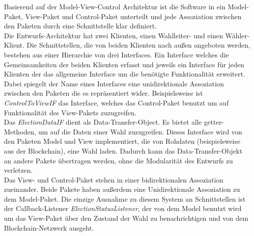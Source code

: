 \documentclass[parskip=full]{scrartcl}
\newcommand{\textitx}[1]{\mbox{\textit{#1}}}
\begin{document}
	Basierend auf der Model-View-Control Architektur ist die Software in ein Model-Paket, View-Paket und Control-Paket unterteilt und jede Assoziation zwischen den Paketen durch eine Schnittstelle klar definiert. 
	\\
	Die Entwurfs-Architektur hat zwei Klienten, einen Wahlleiter- und einen Wähler-Klient. Die Schnittstellen, die von beiden Klienten nach außen angeboten werden, bestehen aus einer Hierarchie von drei Interfaces. Ein Interface welches die Gemeinsamkeiten der beiden Klienten erfasst und jeweils ein Interface für jeden Klienten der das allgemeine Interface um die benötigte Funktionalität erweitert. Dabei spiegelt der Name eines Interfaces eine unidirektionale Assoziation zwischen den Paketen die es repräsentiert wider. Beispielsweise ist \textitx{ControlToViewIF} das Interface, welches das Control-Paket benutzt um auf Funktionalität des View-Pakets zuzugreifen.
	\\
	Das \textitx{ElectionDataIF} dient als Data-Transfer-Object. Es bietet alle getter-Methoden, um auf die Daten einer Wahl zuzugreifen. Dieses Interface wird von den Paketen Model und View implementiert, die von Rohdaten (beispielsweise aus der Blockchain), eine Wahl laden. Dadurch kann das Data-Transfer-Objekt an andere Pakete übertragen werden, ohne die Modularität des Entwurfs zu verletzen.
	\\
	Das View- und Control-Paket stehen in einer bidirektionalen Assoziation zueinander. Beide Pakete haben außerdem eine Unidirektionale Assoziation zu dem Model-Paket. Die einzige Ausnahme zu diesem System an Schnittstellen ist der Callback-Listener \textit{ElectionStatusListener}, der von dem Model benutzt wird um das View-Paket über den Zustand der Wahl zu benachrichtigen und von dem Blockchain-Netzwerk ausgeht.
	\\
\end{document}
